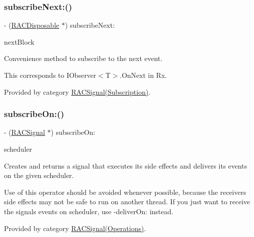 \subsubsection{\texorpdfstring{subscribe\+Next\+:()}{subscribeNext:()}\hspace{0.1cm}{\footnotesize\ttfamily [3/3]}}
{\footnotesize\ttfamily -\/ (\mbox{\hyperlink{interface_r_a_c_disposable}{R\+A\+C\+Disposable}} $\ast$) subscribe\+Next\+: \begin{DoxyParamCaption}\item[{(void($^\wedge$)(id x))}]{next\+Block }\end{DoxyParamCaption}}

Convenience method to subscribe to the {\ttfamily next} event.

This corresponds to {\ttfamily I\+Observer$<$T$>$.On\+Next} in Rx. 

Provided by category \mbox{\hyperlink{category_r_a_c_signal_07_subscription_08_a50d000f05e61411c438e616475deb7f8}{R\+A\+C\+Signal(\+Subscription)}}.

\mbox{\label{interface_r_a_c_signal_a6b8db542f7106880577a943cb8e9da90}} 
\subsubsection{\texorpdfstring{subscribe\+On\+:()}{subscribeOn:()}\hspace{0.1cm}{\footnotesize\ttfamily [1/3]}}
{\footnotesize\ttfamily -\/ (\mbox{\hyperlink{interface_r_a_c_signal}{R\+A\+C\+Signal}} $\ast$) subscribe\+On\+: \begin{DoxyParamCaption}\item[{(\mbox{\hyperlink{interface_r_a_c_scheduler}{R\+A\+C\+Scheduler}} $\ast$)}]{scheduler }\end{DoxyParamCaption}}

Creates and returns a signal that executes its side effects and delivers its events on the given scheduler.

Use of this operator should be avoided whenever possible, because the receiver\textquotesingle{}s side effects may not be safe to run on another thread. If you just want to receive the signal\textquotesingle{}s events on {\ttfamily scheduler}, use -\/deliver\+On\+: instead. 

Provided by category \mbox{\hyperlink{category_r_a_c_signal_07_operations_08_a6b8db542f7106880577a943cb8e9da90}{R\+A\+C\+Signal(\+Operations)}}.


